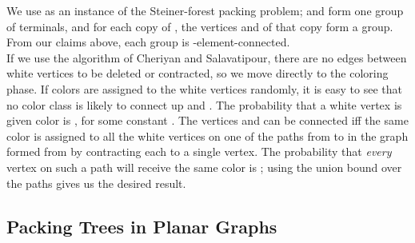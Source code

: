 \documentclass[11pt]{article}
\begin{document}
We use  as an instance of the Steiner-forest packing problem; 
and  form one group of terminals, and for each copy of , the
vertices  and  of that copy form a group. From our claims above,
each group is -element-connected.\\

If we use the algorithm of Cheriyan and Salavatipour, there are no
edges between white vertices to be deleted or contracted, so we move
directly to the coloring phase. If colors are assigned to the white
vertices randomly, it is easy to see that no color class is likely to
connect up  and . The probability that a white vertex is given
color  is , for some constant . The vertices
 and  can be connected iff the same color is assigned to all the
white vertices on one of the  paths from  to  in the graph
formed from  by contracting each  to a single vertex. The
probability that \emph{every} vertex on such a path will receive the
same color is ;
using the union bound over the  paths gives us the desired result.


\subsection{Packing Trees in Planar Graphs}
\label{app:planarPacking}
\end{document}
